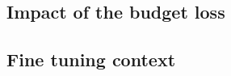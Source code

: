 \subsection{Impact of the budget loss}
\label{sec:chap1:impact_of_budget_loss}


\subsection{Fine tuning context}
\label{sec:chap1:impact_of_fine_tuning}



